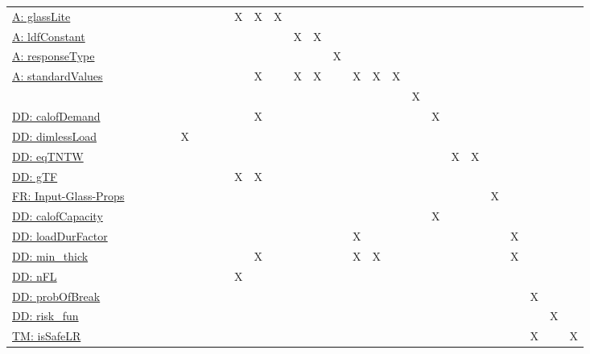 \documentclass[12pt]{article}
\begin{document}
\begin{longtable}{l l l l l l l l l l l l l l l l l l l l l l l l l l l}
\\
\hyperref[assumpGL]{A: glassLite} &  &  &  &  &  &  &  &  & X & X & X &  &  &  &  &  &  &  &  &  &  &  &  &  &  & 
\\
\hyperref[assumpLDFC]{A: ldfConstant} &  &  &  &  &  &  &  &  &  &  &  & X & X &  &  &  &  &  &  &  &  &  &  &  &  & 
\\
\hyperref[assumpRT]{A: responseType} &  &  &  &  &  &  &  &  &  &  &  &  &  & X &  &  &  &  &  &  &  &  &  &  &  & 
\\
\hyperref[assumpSV]{A: standardValues} &  &  &  &  &  &  &  &  &  & X &  & X & X &  & X & X & X &  &  &  &  &  &  &  &  & 
\\
 &  &  &  &  &  &  &  &  &  &  &  &  &  &  &  &  &  & X &  &  &  &  &  &  &  & 
\\
\hyperref[DD:calofDemand]{DD: calofDemand} &  &  &  &  &  &  &  &  &  & X &  &  &  &  &  &  &  &  & X &  &  &  &  &  &  & 
\\
\hyperref[DD:dimlessLoad]{DD: dimlessLoad} &  &  &  &  & X &  &  &  &  &  &  &  &  &  &  &  &  &  &  &  &  &  &  &  &  & 
\\
\hyperref[DD:eqTNTW]{DD: eqTNTW} &  &  &  &  &  &  &  &  &  &  &  &  &  &  &  &  &  &  &  & X & X &  &  &  &  & 
\\
\hyperref[DD:gTF]{DD: gTF} &  &  &  &  &  &  &  &  & X & X &  &  &  &  &  &  &  &  &  &  &  &  &  &  &  & 
\\
\hyperref[inputGlassProps]{FR: Input-Glass-Props} &  &  &  &  &  &  &  &  &  &  &  &  &  &  &  &  &  &  &  &  &  & X &  &  &  & 
\\
\hyperref[DD:calofCapacity]{DD: calofCapacity} &  &  &  &  &  &  &  &  &  &  &  &  &  &  &  &  &  &  & X &  &  &  &  &  &  & 
\\
\hyperref[DD:loadDurFactor]{DD: loadDurFactor} &  &  &  &  &  &  &  &  &  &  &  &  &  &  & X &  &  &  &  &  &  &  & X &  &  & 
\\
\hyperref[DD:min.thick]{DD: min\_thick} &  &  &  &  &  &  &  &  &  & X &  &  &  &  & X & X &  &  &  &  &  &  & X &  &  & 
\\
\hyperref[DD:nFL]{DD: nFL} &  &  &  &  &  &  &  &  & X &  &  &  &  &  &  &  &  &  &  &  &  &  &  &  &  & 
\\
\hyperref[DD:probOfBreak]{DD: probOfBreak} &  &  &  &  &  &  &  &  &  &  &  &  &  &  &  &  &  &  &  &  &  &  &  & X &  & 
\\
\hyperref[DD:risk.fun]{DD: risk\_fun} &  &  &  &  &  &  &  &  &  &  &  &  &  &  &  &  &  &  &  &  &  &  &  &  & X & 
\\
\hyperref[TM:isSafeLR]{TM: isSafeLR} &  &  &  &  &  &  &  &  &  &  &  &  &  &  &  &  &  &  &  &  &  &  &  & X &  & X

\end{longtable}
\end{document}

